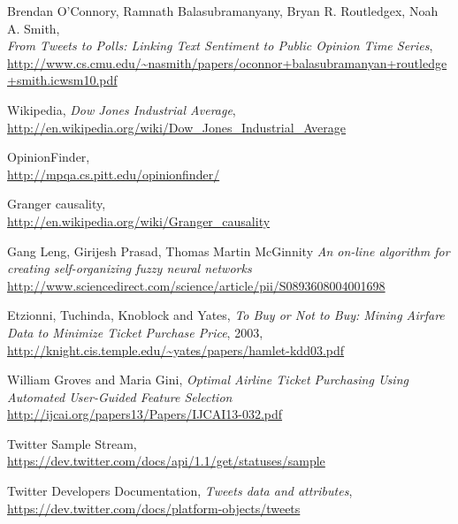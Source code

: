 \documentclass[minf,frontabs,twoside,singlespacing,parskip]{infthesis}
\begin{document}
\begin{thebibliography}{10}
	Brendan O'Connory,  Ramnath Balasubramanyany, Bryan R. Routledgex, Noah A. Smith, \\  
	\emph{From Tweets to Polls: Linking Text Sentiment to Public Opinion Time Series}, \\
	{\url{http://www.cs.cmu.edu/~nasmith/papers/oconnor+balasubramanyan+routledge+smith.icwsm10.pdf}}

	Wikipedia, \emph{Dow Jones Industrial Average}, \\
	{\url{http://en.wikipedia.org/wiki/Dow_Jones_Industrial_Average}}

	OpinionFinder, \\
	{\url{http://mpqa.cs.pitt.edu/opinionfinder/}}
	
	Granger causality, \\
	{\url{http://en.wikipedia.org/wiki/Granger_causality}}

	Gang Leng, Girijesh Prasad, Thomas Martin McGinnity
	\emph{An on-line algorithm for creating self-organizing fuzzy neural networks} \\
	{\url{http://www.sciencedirect.com/science/article/pii/S0893608004001698}}
  
 	Etzionni, Tuchinda, Knoblock and Yates, \emph{To Buy or Not to Buy: Mining Airfare Data to Minimize Ticket Purchase Price}, 2003, \\
  	{\url{http://knight.cis.temple.edu/~yates/papers/hamlet-kdd03.pdf}}
	
	William Groves and Maria Gini, \emph{Optimal Airline Ticket Purchasing Using Automated User-Guided Feature Selection} \\
	{\url{http://ijcai.org/papers13/Papers/IJCAI13-032.pdf}}

	Twitter Sample Stream, \\
	{\url{https://dev.twitter.com/docs/api/1.1/get/statuses/sample}}
	
	Twitter Developers Documentation, \emph{Tweets data and attributes},\\
	{\url{https://dev.twitter.com/docs/platform-objects/tweets}}

\end{thebibliography}
\end{document}
